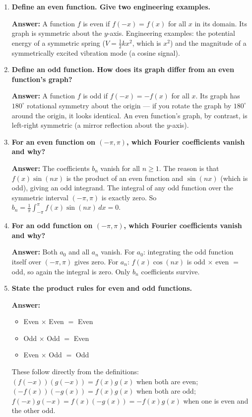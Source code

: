 \documentclass[12pt,a4paper]{article}
\begin{document}
\begin{enumerate}[label=\textbf{Q\arabic*.}]

\item \textbf{Define an even function. Give two engineering examples.}

  \textbf{Answer:} A function $f$ is even if $f(-x) = f(x)$ for all $x$ in its domain. Its
  graph is symmetric about the $y$-axis. Engineering examples: the potential energy of a
  symmetric spring ($V = \frac{1}{2}kx^2$, which is $x^2$) and the magnitude of a symmetrically
  excited vibration mode (a cosine signal).

\item \textbf{Define an odd function. How does its graph differ from an even function's graph?}

  \textbf{Answer:} A function $f$ is odd if $f(-x) = -f(x)$ for all $x$. Its graph has
  $180^{\circ}$ rotational symmetry about the origin --- if you rotate the graph by $180^{\circ}$
  around the origin, it looks identical. An even function's graph, by contrast, is left-right
  symmetric (a mirror reflection about the $y$-axis).

\item \textbf{For an even function on $(-\pi,\pi)$, which Fourier coefficients vanish and why?}

  \textbf{Answer:} The coefficients $b_n$ vanish for all $n \geq 1$. The reason is that
  $f(x)\sin(nx)$ is the product of an even function and $\sin(nx)$ (which is odd), giving an
  odd integrand. The integral of any odd function over the symmetric interval $(-\pi, \pi)$
  is exactly zero. So $b_n = \frac{1}{\pi}\int_{-\pi}^{\pi} f(x)\sin(nx)\,dx = 0$.

\item \textbf{For an odd function on $(-\pi,\pi)$, which Fourier coefficients vanish and why?}

  \textbf{Answer:} Both $a_0$ and all $a_n$ vanish. For $a_0$: integrating the odd function
  itself over $(-\pi,\pi)$ gives zero. For $a_n$: $f(x)\cos(nx)$ is odd $\times$ even $=$ odd,
  so again the integral is zero. Only $b_n$ coefficients survive.

\item \textbf{State the product rules for even and odd functions.}

  \textbf{Answer:}
  \begin{itemize}[nosep]
    \item Even $\times$ Even $=$ Even
    \item Odd $\times$ Odd $=$ Even
    \item Even $\times$ Odd $=$ Odd
  \end{itemize}
  These follow directly from the definitions: $(f(-x))(g(-x)) = f(x)g(x)$ when both are even;
  $(-f(x))(-g(x)) = f(x)g(x)$ when both are odd; $f(-x)g(-x) = f(x)(-g(x)) = -f(x)g(x)$
  when one is even and the other odd.


\end{enumerate}
\end{document}
